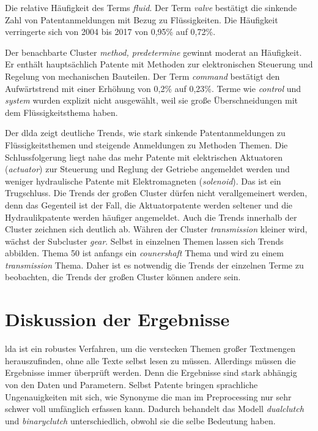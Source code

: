 Die relative Häufigkeit des Terms \emph{fluid}. Der Term \emph{valve} bestätigt die sinkende Zahl von Patentanmeldungen mit Bezug zu Flüssigkeiten. Die Häufigkeit verringerte sich von 2004 bis 2017 von 0,95\% auf 0,72\%.


Der benachbarte Cluster \emph{method, predetermine} gewinnt moderat an Häufigkeit. Er enthält hauptsächlich Patente mit Methoden zur elektronischen Steuerung und Regelung von mechanischen Bauteilen. Der Term \emph{command} bestätigt den Aufwärtstrend mit einer Erhöhung von 0,2\% auf 0,23\%. Terme wie \emph{control} und \emph{system} wurden explizit nicht ausgewählt, weil sie große Überschneidungen mit dem Flüssigkeitsthema haben.


Der \gls{dlda} zeigt deutliche Trends, wie stark sinkende Patentanmeldungen zu Flüssigkeitsthemen und steigende Anmeldungen zu Methoden Themen. Die Schlussfolgerung liegt nahe das mehr Patente mit elektrischen Aktuatoren (\emph{actuator}) zur Steuerung und Reglung der Getriebe angemeldet werden und weniger hydraulische Patente mit Elektromagneten (\emph{solenoid}). Das ist ein Trugschluss. Die Trends der großen Cluster dürfen nicht verallgemeinert werden, denn das Gegenteil ist der Fall, die Aktuatorpatente werden seltener und die Hydraulikpatente werden häufiger angemeldet. Auch die Trends innerhalb der Cluster zeichnen sich deutlich ab. Währen der Cluster \emph{transmission} kleiner wird, wächst der Subcluster \emph{gear}. Selbst in einzelnen Themen lassen sich Trends abbilden. Thema 50 ist anfangs ein \emph{counershaft} Thema und wird zu einem \emph{transmission} Thema. Daher ist es notwendig die Trends der einzelnen Terme zu beobachten, die Trends der großen Cluster können andere sein.


\section{Diskussion der Ergebnisse}

\gls{lda} ist ein robustes Verfahren, um die verstecken Themen großer Textmengen herauszufinden, ohne alle Texte selbst lesen zu müssen. Allerdings müssen die Ergebnisse immer überprüft werden. Denn die Ergebnisse sind stark abhängig von den Daten und Parametern. Selbst Patente bringen sprachliche Ungenauigkeiten mit sich, wie Synonyme die man im Preprocessing nur sehr schwer voll umfänglich erfassen kann. Dadurch behandelt das Modell \emph{dualclutch} und \emph{binaryclutch} unterschiedlich, obwohl sie die selbe Bedeutung haben.

